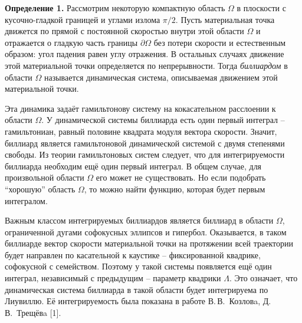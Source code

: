 \vzmscaption


\textbf{Определение 1.} {Рассмотрим некоторую компактную область $ \Omega $ в плоскости с кусочно-гладкой границей и углами излома $ \pi/2 $. Пусть материальная точка движется по прямой с постоянной скоростью внутри этой области $ \Omega $ и отражается о гладкую часть границы $ \partial \Omega $ без потери скорости и естественным образом: угол падения равен углу отражения. В остальных случаях движение этой материальной точки определяется по непрерывности. Тогда \textit{биллиардом} в области $ \Omega $ называется динамическая система, описываемая движением этой материальной точки.}

Эта динамика задаёт гамильтонову систему на кокасательном расслоении к области $\Omega$. У динамической системы биллиарда есть один первый интеграл -- гамильтониан, равный половине квадрата модуля вектора скорости. Значит, биллиард является гамильтоновой динамической системой с двумя степенями свободы. Из теории гамильтоновых систем следует, что для интегрируемости биллиарда необходим ещё один первый интеграл. В общем случае, для произвольной области $ \Omega $ его может не существовать. Но если подобрать ``хорошую'' область $ \Omega $, то можно найти функцию, которая будет первым интегралом.

Важным классом интегрируемых биллиардов является биллиард в области $\Omega$, ограниченной дугами софокусных эллипсов и гипербол. Оказывается, в таком биллиарде вектор скорости материальной точки на протяжении всей траектории будет направлен по касательной к каустике -- фиксированной квадрике, софокусной с семейством. Поэтому у такой системы появляется ещё один интеграл, независимый с предыдущим -- параметр квадрики $ \Lambda $. Это означает, что динамическая система биллиарда в такой области будет интегрируема по Лиувиллю. Её интегрируемость была показана в работе В.\,В.~Козловa, Д.\,В.~Трещёвa [1].


